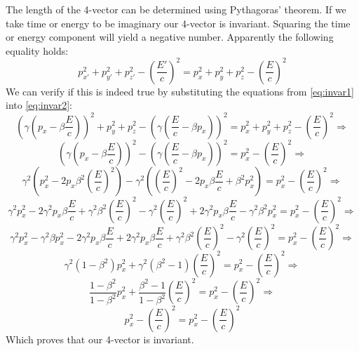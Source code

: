 \documentclass[12pt,a4paper]{article}
\numberwithin{equation}{section}
\numberwithin{figure}{section}
\numberwithin{table}{section}
\begin{document}
The length of the 4-vector can be determined using Pythagoras' theorem. If we take time or energy to be imaginary our 4-vector is invariant. Squaring the time or energy component will yield a negative number. Apparently the following equality holds:
\begin{equation}\label{eq:invar2}
p^2_{x'} + p^2_{y'} + p^2_{z'} - \left( \frac{E'}{c} \right)^2 = p^2_{x} + p^2_{y} + p^2_{z} - \left( \frac{E}{c} \right)^2
\end{equation}
We can verify if this is indeed true by substituting the equations from \ref{eq:invar1} into \ref{eq:invar2}:
\begin{equation}\label{eq:invar3}
\left( \gamma \left( p_x - \beta \frac{E}{c} \right)\right) ^2 + p^2_{y} + p^2_{z} - \left( \gamma \left( \frac{E}{c} - \beta p_x \right) \right)^2  = p^2_{x} + p^2_{y} + p^2_{z} - \left( \frac{E}{c} \right)^2 \Longrightarrow
\end{equation}
\begin{equation}\label{eq:invar4}
\left( \gamma \left( p_x - \beta \frac{E}{c} \right)\right) ^2 - \left( \gamma \left( \frac{E}{c} - \beta p_x \right) \right)^2  = p^2_{x} - \left( \frac{E}{c} \right)^2 \Longrightarrow
\end{equation}
\begin{equation}\label{eq:invar5}
\gamma^2 \left( p^2_x - 2p_x \beta^2 \left( \frac{E}{c}\right)^2\right)  - \gamma^2 \left( \left( \frac{E}{c}\right)^2 -2p_x\beta\frac{E}{c} +\beta^2 p^2_x\right) = p^2_x-\left( \frac{E}{c}\right)^2 \Longrightarrow
\end{equation}
\begin{equation}\label{eq:invar6}
\gamma^2 p^2_x -2\gamma^2 p_x \beta \frac{E}{c} + \gamma^2 \beta^2 \left( \frac{E}{c}\right)^2 - \gamma^2\left( \frac{E}{c} \right)^2 + 2\gamma^2 p_x \beta \frac{E}{c} - \gamma^2 \beta^2 p^2_x =p^2_x-\left( \frac{E}{c}\right)^2 \Longrightarrow
\end{equation}
\begin{equation}\label{eq:invar7}
\gamma^2 p^2_x - \gamma^2 \beta p^2_x - 2\gamma^2 p_x \beta \frac{E}{c} + 2\gamma^2 p_x \beta \frac{E}{c} + \gamma^2 \beta^2 \left( \frac{E}{c}\right)^2 - \gamma^2 \left( \frac{E}{c}\right)^2 =p^2_x-\left( \frac{E}{c}\right)^2 \Longrightarrow
\end{equation}
\begin{equation}\label{eq:invar8}
\gamma^2 \left( 1-\beta^2\right) p^2_x + \gamma^2\left( \beta^2 -1\right) \left(\frac{E}{c} \right)^2 =p^2_x-\left( \frac{E}{c}\right)^2 \Longrightarrow
\end{equation}
\begin{equation}\label{eq:invar9}
\frac{1-\beta^2}{1-\beta^2} p^2_x + \frac{\beta^2 -1}{1-\beta^2}\left(\frac{E}{c} \right)^2 =p^2_x-\left( \frac{E}{c}\right)^2 \Longrightarrow
\end{equation}
\begin{equation}\label{eq:invar10}
p^2_x-\left( \frac{E}{c}\right)^2 =p^2_x-\left( \frac{E}{c}\right)^2 
\end{equation}
Which proves that our 4-vector is invariant.
\end{document}
